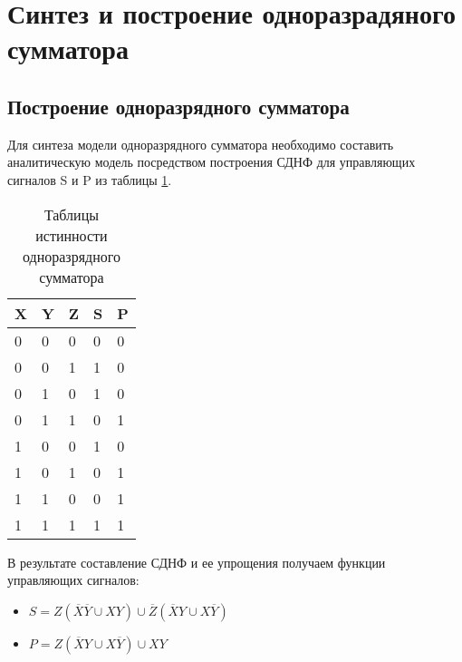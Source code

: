 \section*{Синтез и построение одноразрадяного сумматора}
\subsection*{Построение одноразрядного сумматора}

Для синтеза модели одноразрядного сумматора необходимо составить аналитическую модель 
посредством построения СДНФ для управляющих сигналов S и P из таблицы \ref{table:2}. \par

\begin{table}[h!]
    \begin{center}
        \begin{tabular}{ | m{1cm} | m{1cm} | m{1cm} | m{1cm} | m{1cm} | }
            \hline
            X & Y & Z & S & P \\ \hline
            0 & 0 & 0 & 0 & 0 \\ \hline 
            0 & 0 & 1 & 1 & 0 \\ \hline
            0 & 1 & 0 & 1 & 0 \\ \hline
            0 & 1 & 1 & 0 & 1 \\ \hline
            1 & 0 & 0 & 1 & 0 \\ \hline
            1 & 0 & 1 & 0 & 1 \\ \hline
            1 & 1 & 0 & 0 & 1 \\ \hline
            1 & 1 & 1 & 1 & 1 \\ \hline
        \end{tabular}
        \caption{Таблицы истинности одноразрядного сумматора}
        \label{table:2}
    \end{center}    
\end{table}

В результате составление СДНФ и ее упрощения получаем функции 
управляющих сигналов: \par

\begin{itemize}
    \item $S=Z(\overline{X}\overline{Y} \cup XY) \cup \overline{Z}(\overline{X}Y \cup X\overline{Y})$
    \item $P=Z(\overline{X}Y \cup X\overline{Y}) \cup XY$
\end{itemize}

